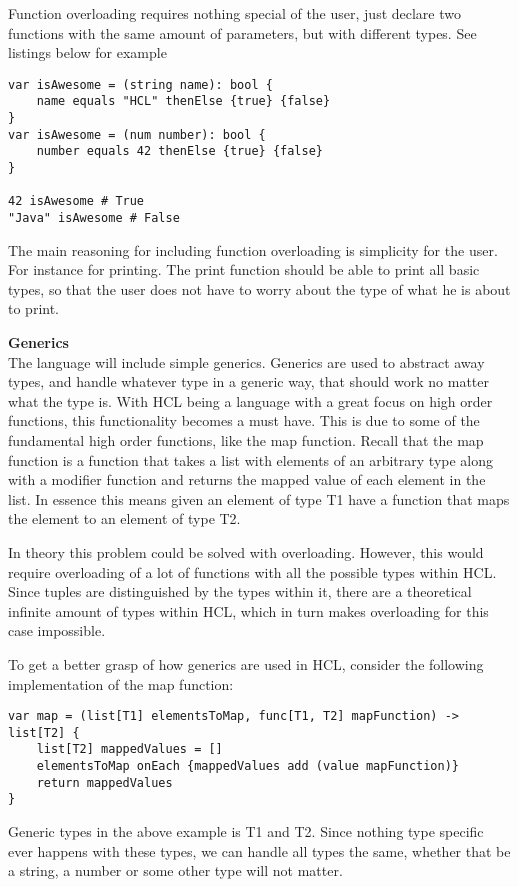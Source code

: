 Function overloading requires nothing special of the user, just declare two functions with the same amount of parameters, but with different types. 
See listings below for example

\begin{lstlisting}
var isAwesome = (string name): bool {
	name equals "HCL" thenElse {true} {false}
}
var isAwesome = (num number): bool {
	number equals 42 thenElse {true} {false}
}

42 isAwesome # True
"Java" isAwesome # False
\end{lstlisting}

The main reasoning for including function overloading is simplicity for the user.
For instance for printing. 
The print function should be able to print all basic types, so that the user does not have to worry about the type of what he is about to print.


\textbf{Generics}\\
The language will include simple generics.
Generics are used to abstract away types, and handle whatever type in a generic way, that should work no matter what the type is.
With HCL being a language with a great focus on high order functions, this functionality becomes a must have.
This is due to some of the fundamental high order functions, like the map function.
Recall that the map function is a function that takes a list with elements of an arbitrary type along with a modifier function and returns the mapped value of each element in the list.
In essence this means given an element of type T1 have a function that maps the element to an element of type T2.

In theory this problem could be solved with overloading. 
However, this would require overloading of a lot of functions with all the possible types within HCL. 
Since tuples are distinguished by the types within it, there are a theoretical infinite amount of types within HCL, which in turn makes overloading for this case impossible.

To get a better grasp of how generics are used in HCL, consider the following implementation of the map function:
\begin{lstlisting}
var map = (list[T1] elementsToMap, func[T1, T2] mapFunction) -> list[T2] {
	list[T2] mappedValues = []
	elementsToMap onEach {mappedValues add (value mapFunction)}
	return mappedValues
}
\end{lstlisting}

Generic types in the above example is T1 and T2. 
Since nothing type specific ever happens with these types, we can handle all types the same, whether that be a string, a number or some other type will not matter.
